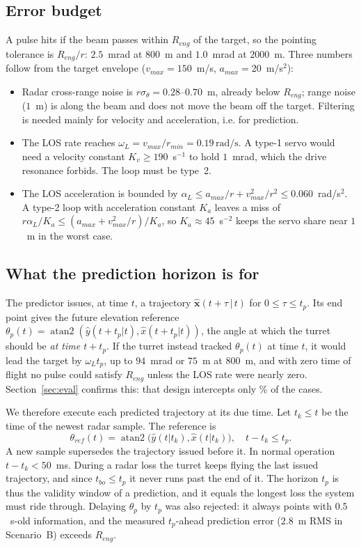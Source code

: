 \documentclass[conference]{IEEEtran}
\newcommand{\Reng}{R_{eng}}
\newcommand{\rads}{\,\mathrm{rad/s}}
\begin{document}
\subsection{Error budget}
A pulse hits if the beam passes within $\Reng$ of the target, so the pointing tolerance is $\Reng/r$: $2.5$~mrad at $800$~m and $1.0$~mrad at $2000$~m. Three numbers follow from the target envelope ($v_{max}=150$~m/s, $a_{max}=20$~m/s$^2$):
\begin{itemize}
\item Radar cross-range noise is $r\sigma_\theta=0.28$--$0.70$~m, already below $\Reng$; range noise ($1$~m) is along the beam and does not move the beam off the target. Filtering is needed mainly for velocity and acceleration, i.e. for prediction.
\item The LOS rate reaches $\omega_{L}=v_{max}/r_{min}=0.19\rads$. A type-1 servo would need a velocity constant $K_v\ge190$~s$^{-1}$ to hold $1$~mrad, which the drive resonance forbids. The loop must be type~2.
\item The LOS acceleration is bounded by $\alpha_{L}\le a_{max}/r+v_{max}^2/r^2\le0.060$~rad/s$^2$. A type-2 loop with acceleration constant $K_a$ leaves a miss of $r\alpha_L/K_a\le(a_{max}+v_{max}^2/r)/K_a$, so $K_a\approx45$~s$^{-2}$ keeps the servo share near $1$~m in the worst case.
\end{itemize}

\subsection{What the prediction horizon is for}
\label{sec:due}
The predictor issues, at time $t$, a trajectory $\hat{\mathbf x}(t+\tau\,|\,t)$ for $0\le\tau\le t_p$. Its end point gives the future elevation reference $\theta_p(t)=\operatorname{atan2}(\hat y(t+t_p|t),\hat x(t+t_p|t))$, the angle at which the turret should be \emph{at time $t+t_p$}. If the turret instead tracked $\theta_p(t)$ at time $t$, it would lead the target by $\omega_L t_p$, up to $94$~mrad or $75$~m at $800$~m, and with zero time of flight no pulse could satisfy $\Reng$ unless the LOS rate were nearly zero. Section~\ref{sec:eval} confirms this: that design intercepts only \AblLeadSucc\% of the cases.

We therefore execute each predicted trajectory at its due time. Let $t_k\le t$ be the time of the newest radar sample. The reference is
\begin{equation}
\theta_{ref}(t)=\operatorname{atan2}\big(\hat y(t|t_k),\hat x(t|t_k)\big),\quad t-t_k\le t_p .
\label{eq:ref}
\end{equation}
A new sample supersedes the trajectory issued before it. In normal operation $t-t_k<50$~ms. During a radar loss the turret keeps flying the last issued trajectory, and since $t_{bo}\le t_p$ it never runs past the end of it. The horizon $t_p$ is thus the validity window of a prediction, and it equals the longest loss the system must ride through. Delaying $\theta_p$ by $t_p$ was also rejected: it always points with $0.5$~s-old information, and the measured $t_p$-ahead prediction error ($2.8$~m RMS in Scenario~B) exceeds $\Reng$.
\end{document}
